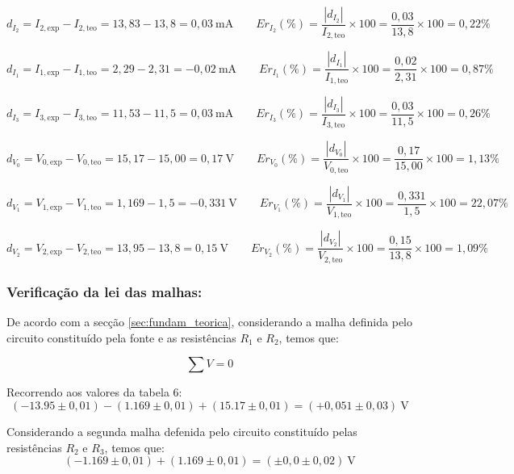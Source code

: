 \[
d_{I_2} = I_{2,\text{exp}} - I_{2,\text{teo}}
= 13,83 - 13,8
= 0,03\ \text{mA}
\qquad
Er_{I_2}(\%) =
\frac{|d_{I_2}|}{I_{2,\text{teo}}}\times100
=
\frac{0,03}{13,8}\times100
= 0,22\%
\]

\[
d_{I_1} = I_{1,\text{exp}} - I_{1,\text{teo}}
= 2,29 - 2,31
= -0,02\ \text{mA}
\qquad
Er_{I_1}(\%) =
\frac{|d_{I_1}|}{I_{1,\text{teo}}}\times100
=
\frac{0,02}{2,31}\times100
= 0,87\%
\]

\[
d_{I_3} = I_{3,\text{exp}} - I_{3,\text{teo}}
= 11,53 - 11,5
= 0,03\ \text{mA}
\qquad
Er_{I_3}(\%) =
\frac{|d_{I_3}|}{I_{3,\text{teo}}}\times100
=
\frac{0,03}{11,5}\times100
= 0,26\%
\]

\[
d_{V_0} = V_{0,\text{exp}} - V_{0,\text{teo}}
= 15,17 - 15,00
= 0,17\ \text{V}
\qquad
Er_{V_0}(\%) =
\frac{|d_{V_0}|}{V_{0,\text{teo}}}\times100
=
\frac{0,17}{15,00}\times100
= 1,13\%
\]

\[
d_{V_1} =  V_{1,\text{exp}} - V_{1,\text{teo}}
= 1,169 - 1,5
= -0,331\ \text{V}
\qquad
Er_{V_1}(\%) =
\frac{|d_{V_1}|}{V_{1,\text{teo}}}\times100
=
\frac{0,331}{1,5}\times100
= 22,07\%
\]

\[
d_{V_2} = V_{2,\text{exp}} - V_{2,\text{teo}}
= 13,95 - 13,8
= 0,15\ \text{V}
\qquad
Er_{V_2}(\%) =
\frac{|d_{V_2}|}{V_{2,\text{teo}}}\times100
=
\frac{0,15}{13,8}\times100
= 1,09\%
\]




\subsubsection{Verificação da lei das malhas:}
De acordo com a secção \ref{sec:fundam_teorica}, considerando a malha definida pelo circuito constituído pela fonte e as resistências $R_1$ e $R_2$, temos que:

\begin{equation*}
	\sum V = 0
\end{equation*}

Recorrendo aos valores da tabela 6:
\begin{equation*}
	(-13.95 \pm 0,01) - (1.169 \pm 0,01) + (15.17 \pm 0,01)
	= (+0,051 \pm 0,03)\ \text{V}
\end{equation*}

Considerando a segunda malha defenida pelo circuito constituído pelas resistências $R_2$ e $R_3$, temos que:
\begin{equation*}
	(-1.169 \pm 0,01) + (1.169 \pm 0,01)
	= (\pm 0,0 \pm 0,02)\ \text{V}
\end{equation*}

